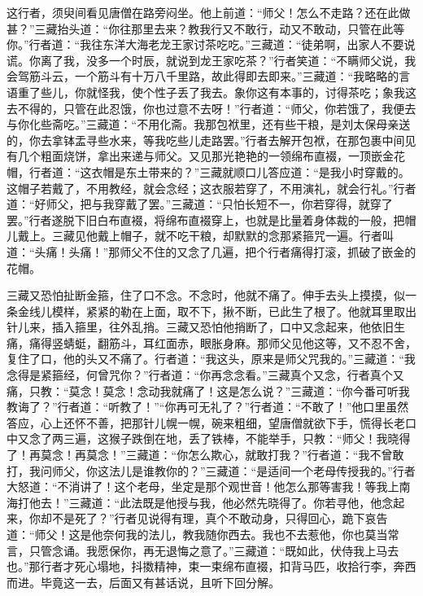 \documentclass[12pt]{lsbook}
\begin{document}
这行者，须臾间看见唐僧在路旁闷坐。他上前道：“师父！怎么不走路？还在此做甚？”三藏抬头道：“你往那里去来？教我行又不敢行，动又不敢动，只管在此等你。”行者道：“我往东洋大海老龙王家讨茶吃吃。”三藏道：“徒弟啊，出家人不要说谎。你离了我，没多一个时辰，就说到龙王家吃茶？”行者笑道：“不瞒师父说，我会驾筋斗云，一个筋斗有十万八千里路，故此得即去即来。”三藏道：“我略略的言语重了些儿，你就怪我，使个性子丢了我去。象你这有本事的，讨得茶吃；象我这去不得的，只管在此忍饿，你也过意不去呀！”行者道：“师父，你若饿了，我便去与你化些斋吃。”三藏道：“不用化斋。我那包袱里，还有些干粮，是刘太保母亲送的，你去拿钵盂寻些水来，等我吃些儿走路罢。”行者去解开包袱，在那包裹中间见有几个粗面烧饼，拿出来递与师父。又见那光艳艳的一领绵布直裰，一顶嵌金花帽，行者道：“这衣帽是东土带来的？”三藏就顺口儿答应道：“是我小时穿戴的。这帽子若戴了，不用教经，就会念经；这衣服若穿了，不用演礼，就会行礼。”行者道：“好师父，把与我穿戴了罢。”三藏道：“只怕长短不一，你若穿得，就穿了罢。”行者遂脱下旧白布直裰，将绵布直裰穿上，也就是比量着身体裁的一般，把帽儿戴上。三藏见他戴上帽子，就不吃干粮，却默默的念那紧箍咒一遍。行者叫道：“头痛！头痛！”那师父不住的又念了几遍，把个行者痛得打滚，抓破了嵌金的花帽。

三藏又恐怕扯断金箍，住了口不念。不念时，他就不痛了。伸手去头上摸摸，似一条金线儿模样，紧紧的勒在上面，取不下，揪不断，已此生了根了。他就耳里取出针儿来，插入箍里，往外乱捎。三藏又恐怕他捎断了，口中又念起来，他依旧生痛，痛得竖蜻蜓，翻筋斗，耳红面赤，眼胀身麻。那师父见他这等，又不忍不舍，复住了口，他的头又不痛了。行者道：“我这头，原来是师父咒我的。”三藏道：“我念得是紧箍经，何曾咒你？”行者道：“你再念念看。”三藏真个又念，行者真个又痛，只教：“莫念！莫念！念动我就痛了！这是怎么说？”三藏道：“你今番可听我教诲了？”行者道：“听教了！”“你再可无礼了？”行者道：“不敢了！”他口里虽然答应，心上还怀不善，把那针儿幌一幌，碗来粗细，望唐僧就欲下手，慌得长老口中又念了两三遍，这猴子跌倒在地，丢了铁棒，不能举手，只教：“师父！我晓得了！再莫念！再莫念！”三藏道：“你怎么欺心，就敢打我？”行者道：“我不曾敢打，我问师父，你这法儿是谁教你的？”三藏道：“是适间一个老母传授我的。”行者大怒道：“不消讲了！这个老母，坐定是那个观世音！他怎么那等害我！等我上南海打他去！”三藏道：“此法既是他授与我，他必然先晓得了。你若寻他，他念起来，你却不是死了？”行者见说得有理，真个不敢动身，只得回心，跪下哀告道：“师父！这是他奈何我的法儿，教我随你西去。我也不去惹他，你也莫当常言，只管念诵。我愿保你，再无退悔之意了。”三藏道：“既如此，伏侍我上马去也。”那行者才死心塌地，抖擞精神，束一束绵布直裰，扣背马匹，收拾行李，奔西而进。毕竟这一去，后面又有甚话说，且听下回分解。

\makebackcover
\end{document}
